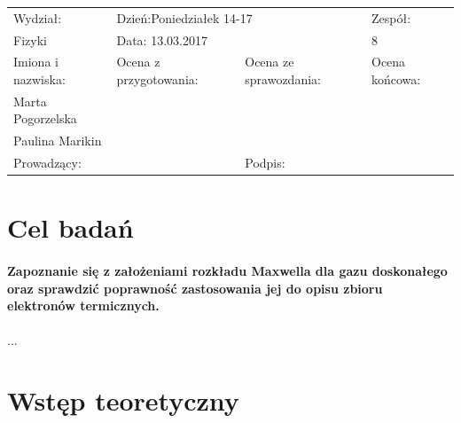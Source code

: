 \documentclass[a4paper,10pt]{article}
\def\arraystretch{1.2}
\begin{document}
\begin{table}
  \centering
  \def\arraystretch{1.5}
    \begin{tabular}{|l|l|l|l|} \hline
    Wydział:           & \multicolumn{2}{l|}{Dzień:Poniedziałek 14-17}    &Zespół:  \\
    Fizyki             &    \multicolumn{2}{l|}{Data: 13.03.2017}         &8             \\\hline
    Imiona i nazwiska: &Ocena z przygotowania:  &Ocena ze sprawozdania:   &Ocena końcowa: \\
    Marta Pogorzelska  &                        &                         &                \\
    Paulina Marikin    &                        &                         &\\\hline
    \multicolumn{2}{|l|}{Prowadzący:                 } &\multicolumn{2}{l|}{Podpis:             }  \\\hline
  \end{tabular}
\end{table}


\section{Cel badań}
\paragraph{Zapoznanie się  z założeniami rozkładu Maxwella dla gazu doskonałego oraz sprawdzić poprawność zastosowania jej do opisu zbioru elektronów termicznych.}...

\section{Wstęp teoretyczny}
\end{document}
